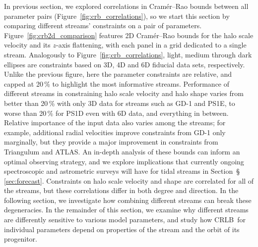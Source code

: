 \documentclass[modern]{aastex61}
\newcommand{\acronym}[1]{{\small{#1}}}
\newcommand{\CRLB}{\acronym{CRLB}}
\begin{document}
In previous section, we explored correlations in Cram\' er--Rao bounds between all parameter pairs (Figure~\ref{fig:crb_correlations}), so we start this section by comparing different streams' constraints on a pair of parameters.
Figure~\ref{fig:crb2d_comparison} features 2D Cram\' er--Rao bounds for the halo scale velocity and its $z$-axis flattening, with each panel in a grid dedicated to a single stream.
Analogously to Figure~\ref{fig:crb_correlations}, light, medium through dark ellipses are constraints based on 3D, 4D and 6D fiducial data sets, respectively.
Unlike the previous figure, here the parameter constraints are relative, and capped at 20\,\% to highlight the most informative streams.
Performance of different streams in constraining halo scale velocity and halo shape varies from better than 20\,\% with only 3D data for streams such as GD-1 and PS1E, to worse than 20\,\% for PS1D even with 6D data, and everything in between.
Relative importance of the input data also varies among the streams; for example, additional radial velocities improve constraints from GD-1 only marginally, but they provide a major improvement in constraints from Triangulum and ATLAS.
An in-depth analysis of these bounds can inform an optimal observing strategy, and we explore implications that currently ongoing spectroscopic and astrometric surveys will have for tidal streams in Section~\S\,\ref{sec:forecast}.
Constraints on halo scale velocity and shape are correlated for all of the streams, but these correlations differ in both degree and direction.
In the following section, we investigate how combining different streams can break these degeneracies.
In the remainder of this section, we examine why different streams are differently sensitive to various model parameters, and study how \CRLB\ for individual parameters depend on properties of the stream and the orbit of its progenitor.
\end{document}
